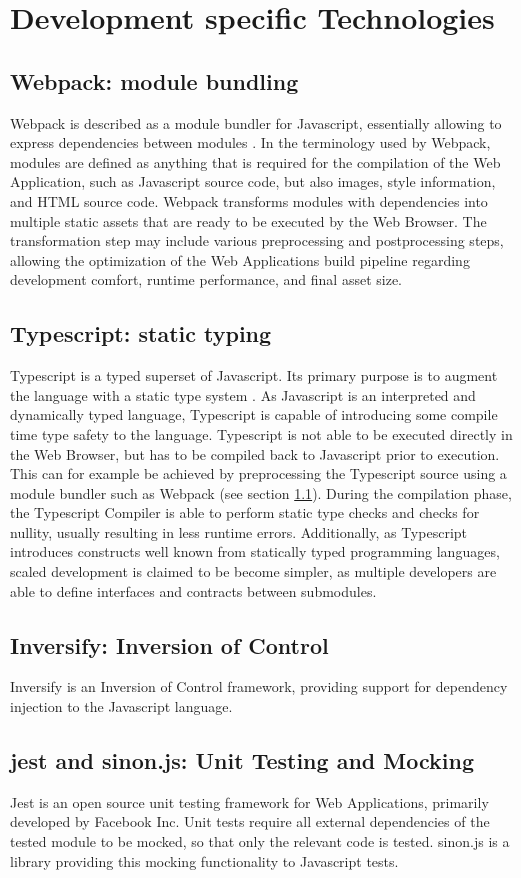 \section{Development specific Technologies}
\subsection{Webpack: module bundling}
\label{sec:tech-webpack}
Webpack is described as a module bundler for Javascript, essentially allowing to express dependencies between modules \cite{WebpackConcepts}. In the terminology used by Webpack, modules are defined as anything that is required for the compilation of the Web Application, such as Javascript source code, but also images, style information, and HTML source code. Webpack transforms modules with dependencies into multiple static assets that are ready to be executed by the Web Browser. The transformation step may include various preprocessing and postprocessing steps, allowing the optimization of the Web Applications build pipeline regarding development comfort, runtime performance, and final asset size.
\subsection{Typescript: static typing}
Typescript is a typed superset of Javascript. Its primary purpose is to augment the language with a static type system \cite{TypescriptUnderstanding}. As Javascript is an interpreted and dynamically typed language, Typescript is capable of introducing some compile time type safety to the language. Typescript is not able to be executed directly in the Web Browser, but has to be compiled back to Javascript prior to execution. This can for example be achieved by preprocessing the Typescript source using a module bundler such as Webpack (see section \ref{sec:tech-webpack}). During the compilation phase, the Typescript Compiler is able to perform static type checks and checks for nullity, usually resulting in less runtime errors. Additionally, as Typescript introduces constructs well known from statically typed programming languages, scaled development is claimed to be become simpler, as multiple developers are able to define interfaces and contracts between submodules. 
\subsection{Inversify: Inversion of Control}
Inversify is an Inversion of Control framework, providing support for dependency injection to the Javascript language.
\subsection{jest and sinon.js: Unit Testing and Mocking}
Jest is an open source unit testing framework for Web Applications, primarily developed by Facebook Inc. Unit tests require all external dependencies of the tested module to be mocked, so that only the relevant code is tested. sinon.js is a library providing this mocking functionality to Javascript tests.